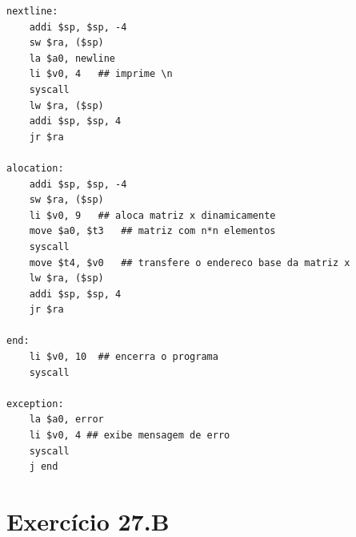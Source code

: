 \documentclass[
	12pt,				%
	oneside,			%
	a4paper,			%
	english,			%
	brazil				%
	]{abntex2ppgsi}
\begin{document}
\begin{lstlisting}[language={[x86masm]Assembler}, caption=Resolução em baixo nível do exercício 27.A]
nextline:
    addi $sp, $sp, -4
    sw $ra, ($sp)
    la $a0, newline
    li $v0, 4   ## imprime \n
    syscall
    lw $ra, ($sp)
    addi $sp, $sp, 4
    jr $ra

alocation:
    addi $sp, $sp, -4
    sw $ra, ($sp)
    li $v0, 9   ## aloca matriz x dinamicamente
    move $a0, $t3   ## matriz com n*n elementos
    syscall
    move $t4, $v0   ## transfere o endereco base da matriz x
    lw $ra, ($sp)
    addi $sp, $sp, 4
    jr $ra

end:
    li $v0, 10  ## encerra o programa
    syscall	

exception:
    la $a0, error
    li $v0, 4 ## exibe mensagem de erro
    syscall
    j end				
\end{lstlisting}

\section{Exercício 27.B}
\end{document}
